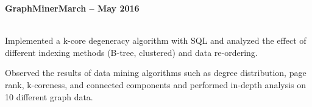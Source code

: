 \documentclass[10pt,margin,line]{resume}
\begin{document}
\begin{resume}
\textbf{GraphMiner}\hfill \textbf{March -- May 2016} \vspace{0mm}\\\vspace{0mm}%
\vspace{-7mm}\\\vspace{-1mm}%
\begin{list3}
    \item Implemented a k-core degeneracy algorithm with SQL and analyzed the effect of different indexing methods (B-tree, clustered) and data re-ordering.
    \item Observed the results of data mining algorithms such as degree distribution, page rank, k-coreness, and connected components and performed in-depth analysis on 10 different graph data.
\end{list3}








\end{resume}
\end{document}
